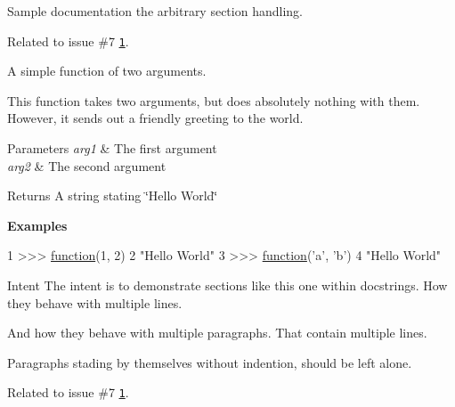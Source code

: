 Sample documentation the arbitrary section handling. 

Related to issue \#7 \href{https://github.com/Feneric/doxypypy/issues/7}{\tt 1}.

A simple function of two arguments. \begin{DoxyVerb}This function takes two arguments, but does absolutely nothing with them.
However, it sends out a friendly greeting to the world.
\end{DoxyVerb}



\begin{DoxyParams}{Parameters}
{\em arg1} & The first argument \\
\hline
{\em arg2} & The second argument\\
\hline
\end{DoxyParams}
\begin{DoxyReturn}{Returns}
A string stating \char`\"{}\-Hello World\char`\"{}
\end{DoxyReturn}
{\bfseries Examples} 
\begin{DoxyCode}
1 >>> \hyperlink{namespacedoxypypy_1_1test_1_1sample__sections_aca57525d1a888c13df067cbe0a4b183d}{function}(1, 2)
2 \textcolor{stringliteral}{"Hello World"}
3 >>> \hyperlink{namespacedoxypypy_1_1test_1_1sample__sections_aca57525d1a888c13df067cbe0a4b183d}{function}(\textcolor{stringliteral}{'a'}, \textcolor{stringliteral}{'b'})
4 \textcolor{stringliteral}{"Hello World"}
\end{DoxyCode}


\begin{DoxyParagraph}{Intent}
The intent is to demonstrate sections like this one within docstrings. How they behave with multiple lines. 
\end{DoxyParagraph}
\begin{DoxyParagraph}{}
And how they behave with multiple paragraphs. That contain multiple lines.
\end{DoxyParagraph}
Paragraphs stading by themselves without indention, should be left alone.

Related to issue \#7 \href{https://github.com/Feneric/doxypypy/issues/7}{\tt 1}.

